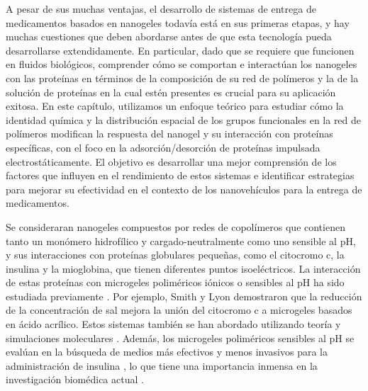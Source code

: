A pesar de sus muchas ventajas, el desarrollo de sistemas de entrega de medicamentos basados en nanogeles todav\'ia est\'a en sus primeras etapas, y hay muchas cuestiones que deben abordarse antes de que esta tecnolog\'ia pueda desarrollarse extendidamente.
En particular, dado que se requiere que funcionen en fluidos biol\'ogicos, comprender c\'omo se comportan e interact\'uan los nanogeles con las prote\'inas en t\'erminos de la composici\'on de su red de pol\'imeros y la de la soluci\'on de prote\'inas en la cual est\'en presentes es crucial para su aplicaci\'on exitosa.
En este cap\'itulo, utilizamos un enfoque te\'orico para estudiar c\'omo la identidad qu\'imica y la distribuci\'on espacial de los grupos funcionales en la red de pol\'imeros modifican la respuesta del nanogel y su interacci\'on con prote\'inas espec\'ificas, con el foco en la adsorci\'on/desorci\'on de prote\'inas impulsada electrost\'aticamente.
El objetivo es desarrollar una mejor comprensi\'on de los factores que influyen en el rendimiento de estos sistemas e identificar estrategias para mejorar su efectividad en el contexto de los nanoveh\'iculos para la entrega de medicamentos.



Se consideraran  nanogeles compuestos por redes de copol\'imeros que contienen tanto un mon\'omero hidrof\'ilico y  cargado-neutralmente como uno sensible al pH, y sus interacciones con prote\'inas globulares peque\~nas, como el citocromo c, la insulina y la mioglobina, que tienen diferentes puntos isoel\'ectricos.
La interacci\'on de estas prote\'inas con microgeles polim\'ericos i\'onicos o sensibles al pH ha sido estudiada previamente \cite{kabanov2009nanogels,smith2011tunable,sharma2022modulating,klinger2011dual}.
Por ejemplo, Smith y Lyon \cite{smith2011tunable} demostraron que la reducci\'on de la concentraci\'on de sal mejora la uni\'on del citocromo c a microgeles basados en \'acido acr\'ilico.
Estos sistemas tambi\'en se han abordado utilizando teor\'ia y simulaciones moleculares \cite{hagemann2018use,oberle2015competitive}.
Adem\'as, los microgeles polim\'ericos sensibles al pH se eval\'uan en la b\'usqueda de medios m\'as efectivos y menos invasivos para la administraci\'on de insulina \cite{lowman1999oral,wong2018microparticles}, lo que tiene una importancia inmensa en la investigaci\'on biom\'edica actual \cite{chaturvedi2013polymeric} .


